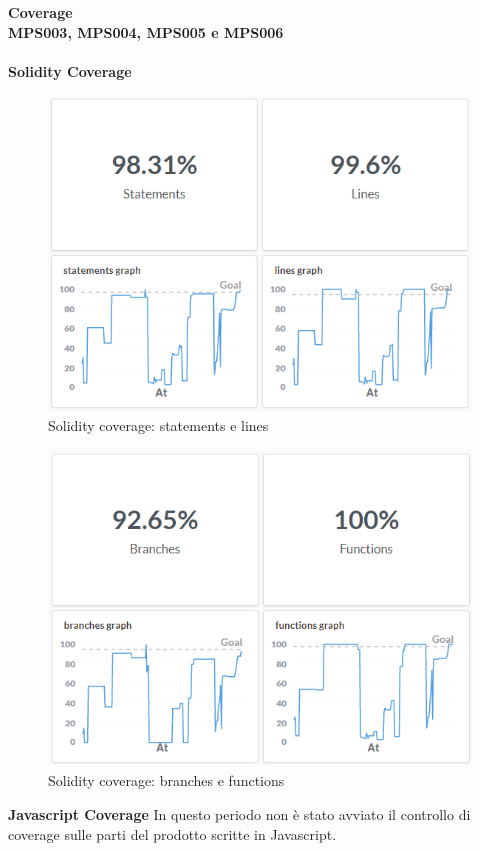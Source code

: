 \documentclass[PianoDiQualifica.tex]{subfiles}
\begin{document}
\newpage
\textbf{Coverage}
\\
\textbf{MPS003, MPS004, MPS005 e MPS006}
\\\\
\textbf{Solidity Coverage}
\begin{figure}[htb]
	\centering
	\includegraphics[width=0.7\linewidth]{RQ/SolidityCoverage1}
	\caption{Solidity coverage: statements e lines}
	\label{fig:processi}
\end{figure}
\begin{figure}[htb]
	\centering
	\includegraphics[width=0.7\linewidth]{RQ/SolidityCoverage2}
	\caption{Solidity coverage: branches e functions}
	\label{fig:processi}
\end{figure}
\newpage
\textbf{Javascript Coverage}
In questo periodo non è stato avviato il controllo di coverage sulle parti del prodotto scritte in Javascript.\\\\
\end{document}
